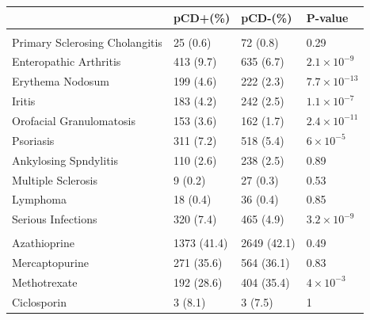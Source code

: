 \begin{table}
  \centering
  \begin{tabular}[t]{llll}
  \toprule
  \textbf{} & \textbf{pCD+(\%)} & \textbf{pCD-(\%)} & \textbf{P-value}\\
  \midrule
  \addlinespace[0.3em]
  \multicolumn{4}{l}{\textbf{Extraintestinal Manifestations}}\\
  \hspace{1em}Primary Sclerosing Cholangitis & 25 (0.6) & 72 (0.8) & 0.29\\
  \hspace{1em}Enteropathic Arthritis & 413 (9.7) & 635 (6.7) & $2.1\times10^{-9}$\\
  \hspace{1em}Erythema Nodosum & 199 (4.6) & 222 (2.3) & $7.7\times10^{-13}$\\
  \hspace{1em}Iritis & 183 (4.2) & 242 (2.5) & $1.1\times10^{-7}$\\
  \hspace{1em}Orofacial Granulomatosis & 153 (3.6) & 162 (1.7) & $2.4\times10^{-11}$\\
  \hspace{1em}Psoriasis & 311 (7.2) & 518 (5.4) & $6\times10^{-5}$\\
  \hspace{1em}Ankylosing Spndylitis & 110 (2.6) & 238 (2.5) & 0.89\\
  \hspace{1em}Multiple Sclerosis & 9 (0.2) & 27 (0.3) & 0.53\\
  \hspace{1em}Lymphoma & 18 (0.4) & 36 (0.4) & 0.85\\
  \hspace{1em}Serious Infections & 320 (7.4) & 465 (4.9) & $3.2\times10^{-9}$\\
  \addlinespace[0.3em]
  \multicolumn{4}{l}{\textbf{Drugs}}\\
  \hspace{1em}Azathioprine & 1373 (41.4) & 2649 (42.1) & 0.49\\
  \hspace{1em}Mercaptopurine & 271 (35.6) & 564 (36.1) & 0.83\\
  \hspace{1em}Methotrexate & 192 (28.6) & 404 (35.4) & ${4\times10^{-3}}$\\
  \hspace{1em}Ciclosporin & 3 (8.1) & 3 (7.5) & 1\\

\end{tabular}
\end{table}
